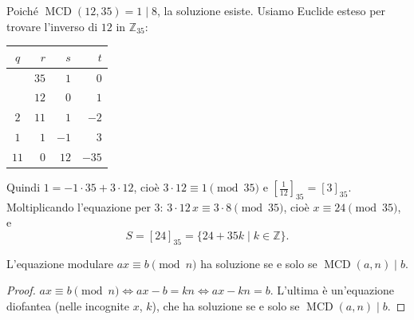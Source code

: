 \documentclass[11pt,a4paper]{article}
\begin{document}
\begin{esempio}
Poiché $\operatorname{MCD}(12, 35) = 1 \mid 8$, la soluzione esiste. Usiamo Euclide esteso per trovare l'inverso di $12$ in $\mathbb{Z}_{35}$:
\begin{center}
\begin{tabular}{c|r|r|r}
$q$ & $r$ & $s$ & $t$ \\
\midrule
 & $35$ & $1$ & $0$ \\
 & $12$ & $0$ & $1$ \\
$2$ & $11$ & $1$ & $-2$ \\
$1$ & $1$ & $-1$ & $3$ \\
$11$ & $0$ & $12$ & $-35$ \\
\end{tabular}
\end{center}
Quindi $1 = -1\cdot 35 + 3\cdot 12$, cioè $3\cdot 12 \equiv 1 \pmod{35}$ e $\left[\tfrac{1}{12}\right]_{35} = [3]_{35}$. Moltiplicando l'equazione per $3$: $3\cdot 12\,x \equiv 3\cdot 8 \pmod{35}$, cioè $x \equiv 24 \pmod{35}$, e
\[
  S = [24]_{35} = \{24 + 35k \mid k \in \mathbb{Z}\}.
\]
\end{esempio}

\begin{proposizione}
L'equazione modulare $ax \equiv b \pmod n$ ha soluzione se e solo se $\operatorname{MCD}(a, n) \mid b$.
\end{proposizione}

\begin{proof}
$ax \equiv b \pmod n \iff ax - b = kn \iff ax - kn = b$. L'ultima è un'equazione diofantea (nelle incognite $x$, $k$), che ha soluzione se e solo se $\operatorname{MCD}(a, n) \mid b$.
\end{proof}
\end{document}
